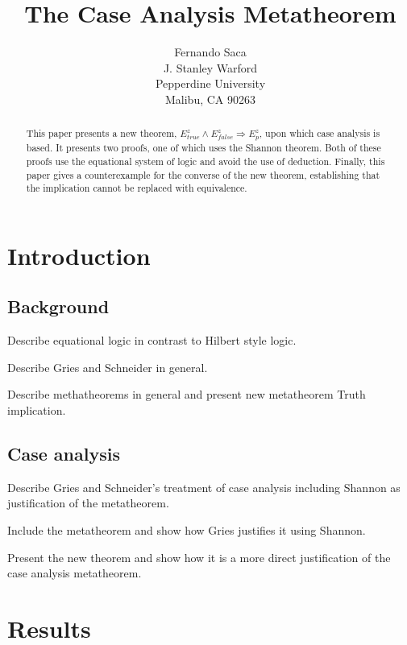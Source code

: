 \documentclass[12pt, fleqn, leqno]{article}
\title{The Case Analysis Metatheorem}
\author{
   Fernando Saca\\
   J. Stanley Warford\\
   Pepperdine University\\
   Malibu, CA 90263}
\date{} %
\newcommand{\impl}{\ensuremath{\Rightarrow}}        %
\begin{document}
\maketitle
\begin{abstract}
This paper presents a new theorem, $E^{z}_{true}\land E^{z}_{false} \impl E^{z}_{p}$, upon which case analysis is based. It presents two proofs, one of which uses the Shannon theorem. Both of these proofs use the equational system of logic and avoid the use of deduction. Finally, this paper gives a counterexample for the converse of the new theorem, establishing that the implication cannot be replaced with equivalence.
\end{abstract}

\thispagestyle{plain}

\section{Introduction}

\subsection{Background}

Describe equational logic in contrast to Hilbert style logic.

Describe Gries and Schneider \cite{Gries} in general.

Describe methatheorems in general and present new metatheorem Truth implication.

\subsection{Case analysis}

Describe Gries and Schneider's treatment of case analysis including Shannon as justification of the metatheorem.

Include the metatheorem and show how Gries justifies it using Shannon. 

Present the new theorem and show how it is a more direct justification of the case analysis metatheorem.

\section{Results}
\end{document}
